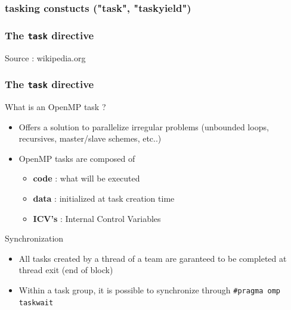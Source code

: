 \subsubsection{tasking constucts ("task", "taskyield")}

\begin{frame}[containsverbatim]
\frametitle{The \texttt{task} directive}
\begin{center}
    {}
\end{center}
Source : wikipedia.org
\end{frame}


\begin{frame}[containsverbatim]
\frametitle{The \texttt{task} directive}

\begin{exampleblock}{What is an OpenMP task ?}
\begin{itemize}
\item{Offers a solution to parallelize irregular problems (unbounded loops, recursives, master/slave schemes, etc..)}
\item{OpenMP tasks are composed of
        \begin{itemize}
        \item{\textbf{code} : what will be executed}
        \item{\textbf{data} : initialized at task creation time }
        \item{\textbf{ICV's} : Internal Control Variables }
        \end{itemize}
}
\end{itemize}
\end{exampleblock}

\begin{exampleblock}{Synchronization}
\begin{itemize}
\item{All tasks created by a thread of a team are garanteed to be completed at
    thread exit (end of block)}
\item{Within a task group, it is possible to synchronize through \texttt{\#pragma
      omp taskwait}}
\end{itemize}
\end{exampleblock}
\end{frame}


